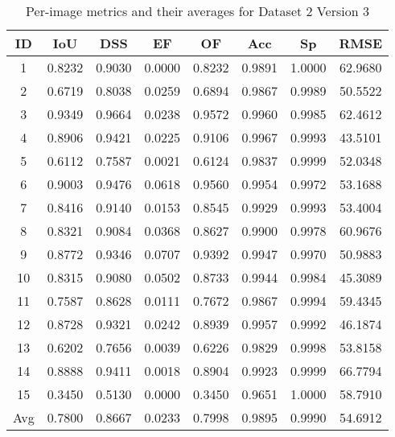 \documentclass[12pt]{article}
\begin{document}
\begin{table}[h]
\centering
\begin{tabular}{|c|c|c|c|c|c|c|c|}
\hline
ID & IoU & DSS & EF & OF & Acc & Sp & RMSE \\
\hline
1 & 0.8232 & 0.9030 & 0.0000 & 0.8232 & 0.9891 & 1.0000 & 62.9680 \\
2 & 0.6719 & 0.8038 & 0.0259 & 0.6894 & 0.9867 & 0.9989 & 50.5522 \\
3 & 0.9349 & 0.9664 & 0.0238 & 0.9572 & 0.9960 & 0.9985 & 62.4612 \\
4 & 0.8906 & 0.9421 & 0.0225 & 0.9106 & 0.9967 & 0.9993 & 43.5101 \\
5 & 0.6112 & 0.7587 & 0.0021 & 0.6124 & 0.9837 & 0.9999 & 52.0348 \\
6 & 0.9003 & 0.9476 & 0.0618 & 0.9560 & 0.9954 & 0.9972 & 53.1688 \\
7 & 0.8416 & 0.9140 & 0.0153 & 0.8545 & 0.9929 & 0.9993 & 53.4004 \\
8 & 0.8321 & 0.9084 & 0.0368 & 0.8627 & 0.9900 & 0.9978 & 60.9676 \\
9 & 0.8772 & 0.9346 & 0.0707 & 0.9392 & 0.9947 & 0.9970 & 50.9883 \\
10 & 0.8315 & 0.9080 & 0.0502 & 0.8733 & 0.9944 & 0.9984 & 45.3089 \\
11 & 0.7587 & 0.8628 & 0.0111 & 0.7672 & 0.9867 & 0.9994 & 59.4345 \\
12 & 0.8728 & 0.9321 & 0.0242 & 0.8939 & 0.9957 & 0.9992 & 46.1874 \\
13 & 0.6202 & 0.7656 & 0.0039 & 0.6226 & 0.9829 & 0.9998 & 53.8158 \\
14 & 0.8888 & 0.9411 & 0.0018 & 0.8904 & 0.9923 & 0.9999 & 66.7794 \\
15 & 0.3450 & 0.5130 & 0.0000 & 0.3450 & 0.9651 & 1.0000 & 58.7910 \\
\hline
Avg & 0.7800 & 0.8667 & 0.0233 & 0.7998 & 0.9895 & 0.9990 & 54.6912 \\
\hline
\end{tabular}
\caption{Per-image metrics and their averages for Dataset 2 Version 3}
\end{table}
\end{document}
